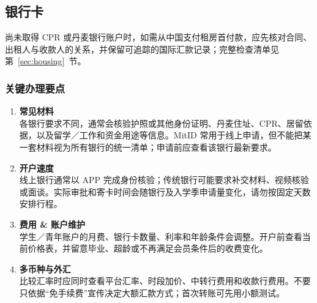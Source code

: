 
\subsection{银行卡}

尚未取得 CPR 或丹麦银行账户时，如需从中国支付租房首付款，应先核对合同、出租人与收款人的关系，并保留可追踪的国际汇款记录；完整检查清单见第~\ref{sec:housing}~节。

\subsubsection{关键办理要点}

\begin{enumerate}[leftmargin=3em,label=\arabic*.]
  \item \textbf{常见材料}\\
        各银行要求不同，通常会核验护照或其他身份证明、丹麦住址、CPR、居留依据，以及留学／工作和资金用途等信息。MitID 常用于线上申请，但不能把某一套材料视为所有银行的统一清单；申请前应查看该银行最新要求。
  
  \item \textbf{开户速度}\\
        线上银行通常以 APP 完成身份核验；传统银行可能要求补交材料、视频核验或面谈。实际审批和寄卡时间会随银行及入学季申请量变化，请勿按固定天数安排行程。
  
  \item \textbf{费用 \& 账户维护}\\
        学生／青年账户的月费、银行卡数量、利率和年龄条件会调整。开户前查看当前价格表，并留意毕业、超龄或不再满足会员条件后的收费变化。
  
  \item \textbf{多币种与外汇}\\
        比较汇率时应同时查看平台汇率、时段加价、中转行费用和收款行费用。不要只依据“免手续费”宣传决定大额汇款方式；首次转账可先用小额测试。
\end{enumerate}

